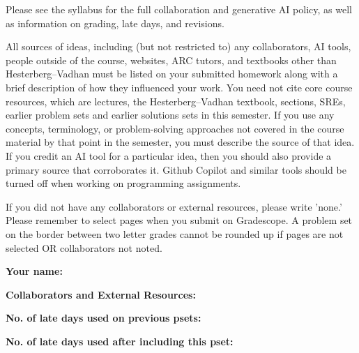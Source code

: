\documentclass[11pt]{article}
\begin{document}

Please see the syllabus for the full collaboration and generative AI policy, as well as information on grading, late days, and revisions.

All sources of ideas, including (but not restricted to) any collaborators, AI tools, people outside of the course, websites, ARC tutors, and textbooks other than Hesterberg--Vadhan must be listed on your submitted homework along with a brief description of how they influenced your work. You need not cite core course resources, which are lectures, the Hesterberg--Vadhan textbook, sections, SREs, earlier problem sets and earlier solutions sets in this semester. If you use any concepts, terminology, or problem-solving approaches not covered in the course material by that point in the semester, you must describe the source of that idea. If you credit an AI tool for a particular idea, then you should also provide a primary source that corroborates it. Github Copilot and similar tools should be turned off when working on programming assignments.

If you did not have any collaborators or external resources, please write 'none.' Please remember to select pages when you submit on Gradescope. A problem set on the border between two letter grades cannot be rounded up if pages are not selected OR collaborators not noted.
\newline

\textbf{Your name: }

\textbf{Collaborators and External Resources:}

\textbf{No. of late days used on previous psets: }

\textbf{No. of late days used after including this pset: }

\vspace{1em}

\newpage
\end{document}
